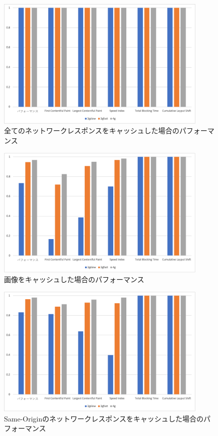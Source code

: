 \begin{figure}
  \centering
  \includegraphics[width=0.9\textwidth]{images/service_worker_cache_all.png}
  \caption{全てのネットワークレスポンスをキャッシュした場合のパフォーマンス}\label{figure:全てのネットワークレスポンスをキャッシュした場合のパフォーマンス}
\end{figure}

\begin{figure}
  \centering
  \includegraphics[width=0.9\textwidth]{images/service_worker_cache_images.png}
  \caption{画像をキャッシュした場合のパフォーマンス}\label{figure:画像をキャッシュした場合のパフォーマンス}
\end{figure}

\begin{figure}
  \centering
  \includegraphics[width=0.9\textwidth]{images/service_worker_cache_same_origin.png}
  \caption{Same-Originのネットワークレスポンスをキャッシュした場合のパフォーマンス}\label{figure:Same-Originのネットワークレスポンスをキャッシュした場合のパフォーマンス}
\end{figure}

